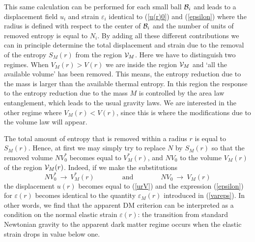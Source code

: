 \documentclass[a4paper,12pt]{article}
\begin{document}
This same calculation can be performed for each small ball ${\cal B}_i$ and leads to a displacement field  
$u_i$ and strain $\varepsilon_i$ identical to (\ref{u(r)0}) and (\ref{epsilon}) where the radius is defined 
with respect to the center of ${\cal B}_i$ and the number of units of removed entropy is equal to $N_i$.  By adding all these different contributions we can in principle determine the total displacement and strain due to the removal of the entropy $S_M(r)$ from the region ${\cal V}_M$.  Here we have to distinguish two regimes. When $V_M(r) >V(r)$ we are inside the region ${\cal V}_M$ and `all the available volume' has been removed. This means, the entropy reduction due to the mass is larger than the available thermal entropy. In this region the response to the entropy reduction due to the mass $M$ is controlled by the area law entanglement, which leads to the usual gravity laws. We are interested in the other regime where $V_M(r) < V(r)$, since this is where the modifications due to the volume law will appear. 

 The total amount  of entropy that is removed within a radius $r$ is equal to $S_M(r)$. 
 Hence, at first we may simply try to replace $N$ by $S_M(r)$ so that the removed volume $NV^*_0$ becomes equal to $V_M^*(r)$, and $NV_0$ to the volume $V_M(r)$ of the region ${\cal V}_M(r)$. Indeed, if we make the substitutions
\begin{equation}
\label{substitute}
NV^*_0\ \longrightarrow\ V^*_M(r)	\qquad\qquad\mbox{and}\qquad\qquad NV_0\ \longrightarrow\  V_M(r)
\end{equation}  
the displacement $u(r)$ becomes equal to (\ref{urV}) and the expression (\ref{epsilon}) for $\varepsilon(r)$  becomes identical to the quantity $\varepsilon_M(r)$ introduced in (\ref{vareps}). In other words, we find that the apparent DM criterion can be interpreted as a condition on the normal elastic strain $\varepsilon(r)$: the transition from standard Newtonian gravity to the apparent dark matter regime occurs when the elastic strain drops in value below one.  
\end{document}

